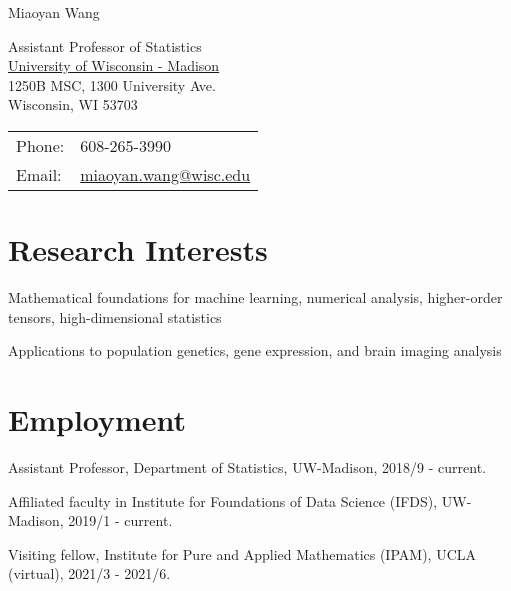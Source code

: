 \documentclass[letterpaper]{article}
\def\name{Miaoyan Wang}
\renewenvironment{itemize}{
  \begin{list}{}{
    \setlength{\leftmargin}{1.5em}
  }
}{
  \end{list}
}
\begin{document}
{\huge \name}


\vspace{0.25in}

\begin{minipage}{0.45\linewidth}
Assistant Professor of Statistics\\
  \href{}{University of Wisconsin - Madison} \\
1250B MSC, 1300 University Ave.\\
Wisconsin, WI 53703\\

\end{minipage}
\begin{minipage}{0.45\linewidth}
  \begin{tabular}{ll}
    Phone: & 608-265-3990 \\
    Email: & \href{miaoyan.wang@wisc.edu}{miaoyan.wang@wisc.edu}\\
  \end{tabular}
\end{minipage}

\section*{Research Interests}
\begin{itemize}
\item Mathematical foundations for machine learning, numerical analysis, higher-order tensors, high-dimensional statistics
\item Applications to population genetics, gene expression, and brain imaging analysis
\end{itemize}


\section*{Employment}
\begin{itemize}
\item Assistant Professor, Department of Statistics, UW-Madison, 2018/9 - current.
\item Affiliated faculty in Institute for Foundations of Data Science (IFDS), UW-Madison, 2019/1 - current.
\item Visiting fellow, Institute for Pure and Applied Mathematics (IPAM), UCLA (virtual), 2021/3 - 2021/6. 

\end{itemize}
\end{document}
